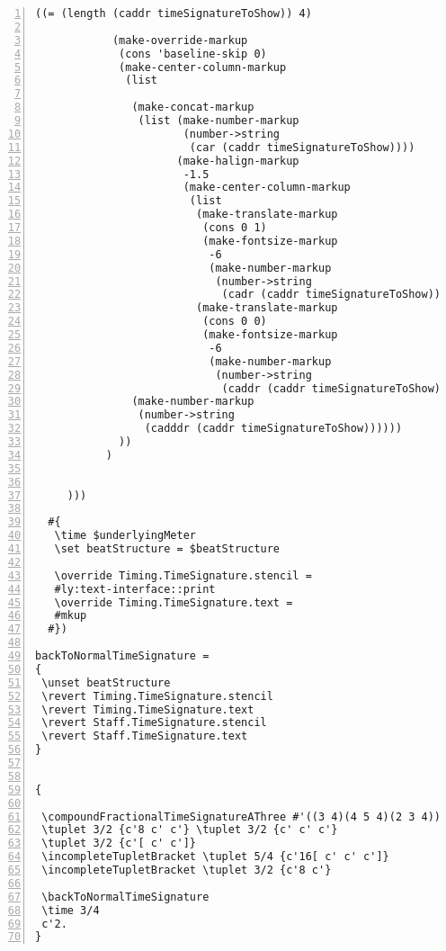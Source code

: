 \begin{Verbatim}[numbers=left,xleftmargin=5mm]
           ((= (length (caddr timeSignatureToShow)) 4)

            (make-override-markup
             (cons 'baseline-skip 0)
             (make-center-column-markup
              (list

               (make-concat-markup
                (list (make-number-markup
                       (number->string
                        (car (caddr timeSignatureToShow))))
                      (make-halign-markup
                       -1.5
                       (make-center-column-markup
                        (list
                         (make-translate-markup
                          (cons 0 1)
                          (make-fontsize-markup
                           -6
                           (make-number-markup
                            (number->string
                             (cadr (caddr timeSignatureToShow))))))
                         (make-translate-markup
                          (cons 0 0)
                          (make-fontsize-markup
                           -6
                           (make-number-markup
                            (number->string
                             (caddr (caddr timeSignatureToShow)))))))))))
               (make-number-markup
                (number->string
                 (cadddr (caddr timeSignatureToShow))))))
             ))
           )


     )))

  #{
   \time $underlyingMeter
   \set beatStructure = $beatStructure

   \override Timing.TimeSignature.stencil =
   #ly:text-interface::print
   \override Timing.TimeSignature.text =
   #mkup
  #})

backToNormalTimeSignature =
{
 \unset beatStructure
 \revert Timing.TimeSignature.stencil
 \revert Timing.TimeSignature.text
 \revert Staff.TimeSignature.stencil
 \revert Staff.TimeSignature.text
}


{

 \compoundFractionalTimeSignatureAThree #'((3 4)(4 5 4)(2 3 4)) 67/60 3,3,3,4,2
 \tuplet 3/2 {c'8 c' c'} \tuplet 3/2 {c' c' c'}
 \tuplet 3/2 {c'[ c' c']}
 \incompleteTupletBracket \tuplet 5/4 {c'16[ c' c' c']}
 \incompleteTupletBracket \tuplet 3/2 {c'8 c'}

 \backToNormalTimeSignature
 \time 3/4
 c'2.
}
\end{Verbatim}



